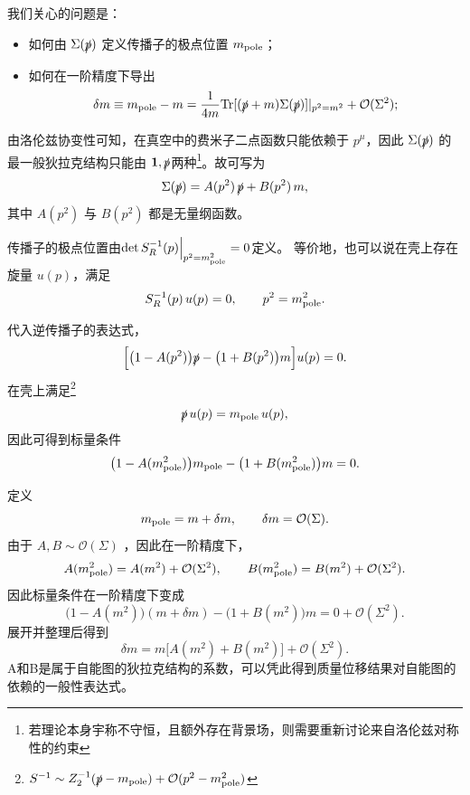 我们关心的问题是：

\begin{itemize}
    \item 如何由 \(\Sigma(\slashed p)\) 定义传播子的极点位置 \(m_{\rm pole}\)；
    \item 如何在一阶精度下导出
    \begin{equation}
    \delta m \equiv m_{\rm pole}-m
    =\frac{1}{4m}\text{Tr}[(\slashed p+m)\Sigma(\slashed p)]|_{p^2=m^2}
    +\mathcal{O}(\Sigma^2);
    \end{equation}
\end{itemize}
由洛伦兹协变性可知，在真空中的费米子二点函数只能依赖于 \(p^\mu\)，因此 \(\Sigma(\slashed p)\) 的最一般狄拉克结构只能由
$\mathbf{1},  \slashed p$两种\footnote{若理论本身宇称不守恒，且额外存在背景场，则需要重新讨论来自洛伦兹对称性的约束}。故可写为
\begin{equation}
\Sigma(\slashed p)=A(p^2)\,\slashed p+B(p^2)\,m,
\end{equation}
其中 \(A(p^2)\) 与 \(B(p^2)\) 都是无量纲函数。

传播子的极点位置由$\det S_R^{-1}(p)\Big|_{p^2=m_{\rm pole}^2}=0$定义。
等价地，也可以说在壳上存在旋量 \(u(p)\)，满足
\begin{equation}
S_R^{-1}(p)\,u(p)=0,
\qquad p^2=m_{\rm pole}^2.
\end{equation}

代入逆传播子的表达式，
\begin{equation}
\Big[
\bigl(1-A(p^2)\bigr)\slashed p
-
\bigl(1+B(p^2)\bigr)m
\Big]u(p)=0.
\end{equation}
在壳上满足\footnote{$S^{-1}\sim Z_2^{-1}(\slashed{p}-m_{\text{pole}} )+ \mathcal{O}(p^2-m_{\text{pole}}^2)$}
\begin{equation}
\slashed p\,u(p)=m_{\rm pole}\,u(p),
\end{equation}
因此可得到标量条件
\begin{equation}
\bigl(1-A(m_{\rm pole}^2)\bigr)m_{\rm pole}
-
\bigl(1+B(m_{\rm pole}^2)\bigr)m=0.
\end{equation}

定义
\begin{equation}
m_{\rm pole}=m+\delta m,
\qquad
\delta m=\mathcal{O}(\Sigma).
\end{equation}
由于 $A, B\sim \mathcal{O}(\Sigma)$ ，因此在一阶精度下，
\begin{equation}
A(m_{\rm pole}^2)=A(m^2)+\mathcal{O}(\Sigma^2),
\qquad
B(m_{\rm pole}^2)=B(m^2)+\mathcal{O}(\Sigma^2).
\end{equation}
因此标量条件在一阶精度下变成
\begin{equation}
\bigl(1-A(m^2)\bigr)(m+\delta m)-\bigl(1+B(m^2)\bigr)m=0
+\mathcal{O}(\Sigma^2).
\end{equation}
展开并整理后得到
\begin{equation}
\delta m
=
m\bigl[A(m^2)+B(m^2)\bigr]+\mathcal{O}(\Sigma^2).
\end{equation}
A和B是属于自能图的狄拉克结构的系数，可以凭此得到质量位移结果对自能图的依赖的一般性表达式。

